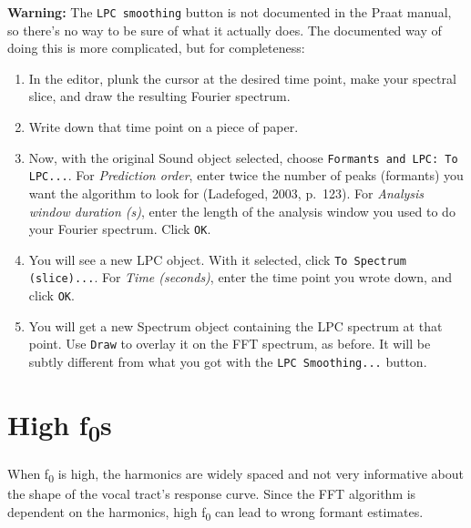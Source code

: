 \documentclass[12pt]{article}
\begin{document}
\begin{figure}[h!]
\centering
{}
\end{figure}

\noindent\textbf{Warning:} The \texttt{LPC smoothing} button is not documented in the Praat manual, so there’s no way to be sure of what it actually does. The documented way of doing this is more complicated, but for completeness:

\begin{enumerate}[label=(\alph*)]
    \item In the editor, plunk the cursor at the desired time point, make your spectral slice, and draw the resulting Fourier spectrum.
    \item Write down that time point on a piece of paper.
    \item Now, with the original Sound object selected, choose \texttt{Formants and LPC: To LPC...}. For \textit{Prediction order}, enter twice the number of peaks (formants) you want the algorithm to look for (Ladefoged, 2003, p.~123). For \textit{Analysis window duration (s)}, enter the length of the analysis window you used to do your Fourier spectrum. Click \texttt{OK}.
    \item You will see a new LPC object. With it selected, click \texttt{To Spectrum (slice)...}. For \textit{Time (seconds)}, enter the time point you wrote down, and click \texttt{OK}.
    \item You will get a new Spectrum object containing the LPC spectrum at that point. Use \texttt{Draw} to overlay it on the FFT spectrum, as before. It will be subtly different from what you got with the \texttt{LPC Smoothing...} button.
\end{enumerate}

\section{High f\textsubscript{0}s}

When f\textsubscript{0} is high, the harmonics are widely spaced and not very informative about the shape of the vocal tract’s response curve. Since the FFT algorithm is dependent on the harmonics, high f\textsubscript{0} can lead to wrong formant estimates. 
\end{document}
